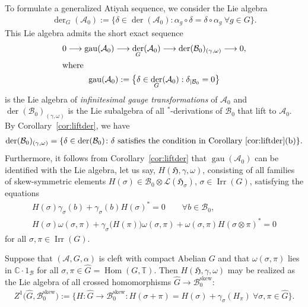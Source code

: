 \documentclass[pdftex]{sigma}
\numberwithin{equation}{section}
\newcommand*{\C}{\mathbb C}		%
\newcommand*{\tensor}{\otimes}		%
\DeclareMathOperator{\der}{der}
\DeclareMathOperator{\gau}{gau}
\DeclareMathOperator{\Hom}{Hom}
\newcommand*{\Star}{$^*$\nobreakdash}
\newcommand*{\hilb}{\mathfrak}		%
\newcommand*{\alg}{\mathcal}		%
\newcommand*{\hH}{\hilb{H}}			%
\newcommand*{\one}{1}				%
\newcommand*{\aA}{\alg{A}}			%
\newcommand*{\aB}{\alg{B}} 			%
\newcommand*{\End}{\mathcal{L}} %
\DeclareMathOperator{\Irrep}{Irr} 			%
\begin{document}
To formulate a generalized Atiyah sequence, we consider the Lie algebra
\begin{gather*}
	\der_G(\aA_0) := \{ \delta \in \der(\aA_0)\colon \alpha_g \circ \delta = \delta \circ \alpha_g \ \forall g \in G \}.
\end{gather*}
This Lie algebra admits the short exact sequence
\begin{gather*}\label{eq:AtiyahNC}
	0 \longrightarrow \gau(\aA_0) \longrightarrow \der_G(\aA_0)\longrightarrow \der(\aB_0)_{(\gamma,\omega)} \longrightarrow 0,
	\\
	\shortintertext{where}
	\gau(\aA_0) := \bigl\{\delta \in \der_G(\aA_0) : \delta_{\mid \aB_0} = 0 \bigr\}
\end{gather*}
is the Lie algebra of \emph{infinitesimal gauge transformations} of $\aA_0$ and $\der(\aB_0)_{(\gamma,\omega)}$ is the Lie subalgebra of all \Star-derivations of $\aB_0$ that lift to $\aA_0$.
By Corollary~\ref{cor:liftder}, we have
\begin{gather*}
	\der(\aB_0)_{(\gamma,\omega)} = \{ \delta \in \der(\aB_0)\colon \text{$\delta$ satisfies the condition in Corollary~\ref{cor:liftder}(b)} \}.
\end{gather*}
Furthermore, it follows from Corollary~\ref{cor:liftder} that $\gau(\aA_0)$ can be identified with the Lie algebra, let us say, $H(\hH, \gamma, \omega)$, consisting of all families of skew-symmetric elements $H(\sigma) \in \aB_0 \tensor \End(\hH_\sigma)$, $\sigma \in \Irrep(G)$, satisfying the equations
\begin{gather*}%
		 H(\sigma) \gamma_\sigma(b) + \gamma_\sigma(b) H(\sigma)^* = 0
		\qquad 	\forall b \in \aB_0,\\
		 H(\sigma) \omega(\sigma,\pi) + \gamma_\sigma\big(H(\pi)\big) \omega(\sigma,\pi) + \omega(\sigma,\pi) H(\sigma \tensor \pi)^* = 0
	\end{gather*}
for all $\sigma, \pi \in \Irrep(G)$.

\begin{Remark}\label{rem:At_cleft}
Suppose that $(\aA,G,\alpha)$ is cleft with compact Abelian $G$ and that $\omega(\sigma,\pi)$ lies in $\C \cdot \one_\aB$ for all $\sigma,\pi \in \hat G = \Hom(G,\mathbb{T})$. Then $H(\hH, \gamma, \omega)$ may be realized as the Lie algebra of all crossed homomorphisms $\hat G \to \aB_0^{\text{skew}}$:
	\begin{gather*}
		Z^1\big( \hat G, \aB_0^{\text{skew}} \big) := \big\{ H\colon \hat G \to \aB_0^{\text{skew}}\colon H(\sigma+\pi) = H(\sigma) + \gamma_\sigma(H_\pi) \ \forall \sigma,\pi \in \hat G \big\}.
	\end{gather*}
\end{Remark}
\end{document}
